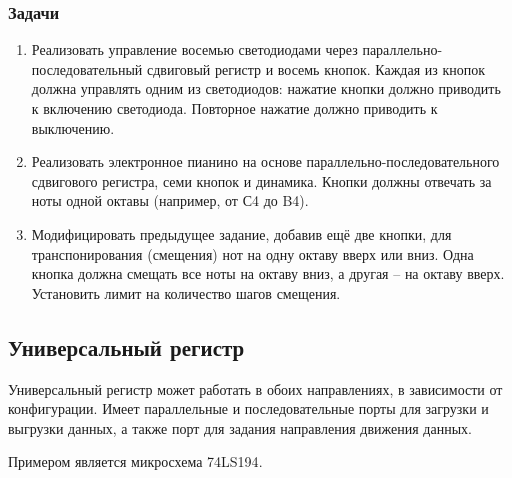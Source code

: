 \documentclass[../sparc.tex]{subfiles}
\begin{document}
\subsubsection{Задачи}

\begin{enumerate}
\item Реализовать управление восемью светодиодами через
  параллельно-последовательный сдвиговый регистр и восемь кнопок.  Каждая из
  кнопок должна управлять одним из светодиодов: нажатие кнопки должно приводить
  к включению светодиода.  Повторное нажатие должно приводить к выключению.
\item Реализовать электронное пианино на основе параллельно-последовательного
  сдвигового регистра, семи кнопок и динамика.  Кнопки должны отвечать за ноты
  одной октавы (например, от С4 до B4).
\item Модифицировать предыдущее задание, добавив ещё две кнопки, для
  транспонирования (смещения) нот на одну октаву вверх или вниз.  Одна кнопка
  должна смещать все ноты на октаву вниз, а другая -- на октаву вверх.
  Установить лимит на количество шагов смещения.
\end{enumerate}

\subsection{Универсальный регистр}

Универсальный регистр может работать в обоих направлениях, в зависимости от
конфигурации.  Имеет параллельные и последовательные порты для загрузки и
выгрузки данных, а также порт для задания направления движения данных.

Примером является микросхема 74LS194\cite{ti:sn74ls194a}.

\end{document}
